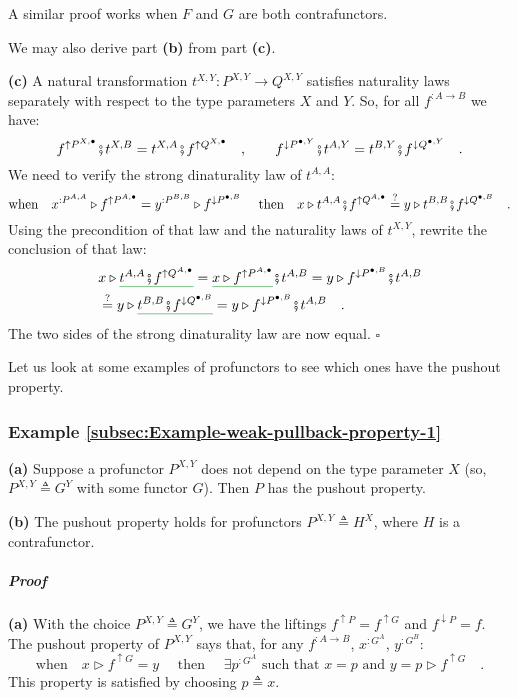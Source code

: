 A similar proof works when $F$ and $G$ are both contrafunctors.

We may also derive part \textbf{(b)} from part \textbf{(c)}.

\textbf{(c)} A natural transformation $t^{X,Y}:P^{X,Y}\rightarrow Q^{X,Y}$
satisfies naturality laws separately with respect to the type parameters
$X$ and $Y$. So, for all $f^{:A\rightarrow B}$ we have:
\[
f^{\uparrow P^{X,\bullet}}\bef t^{X,B}=t^{X,A}\bef f^{\uparrow Q^{X,\bullet}}\quad,\quad\quad f^{\downarrow P^{\bullet,Y}}\bef t^{A,Y}=t^{B,Y}\bef f^{\downarrow Q^{\bullet,Y}}\quad.
\]
We need to verify the strong dinaturality law of $t^{A,A}$:
\[
\text{when}\quad x^{:P^{A,A}}\triangleright f^{\uparrow P^{A,\bullet}}=y^{:P^{B,B}}\triangleright f^{\downarrow P^{\bullet,B}}\quad\text{ then}\quad x\triangleright t^{A,A}\bef f^{\uparrow Q^{A,\bullet}}\overset{?}{=}y\triangleright t^{B,B}\bef f^{\downarrow Q^{\bullet,B}}\quad.
\]
Using the precondition of that law and the naturality laws of $t^{X,Y}$,
rewrite the conclusion of that law:
\begin{align*}
 & x\triangleright\gunderline{t^{A,A}\bef f^{\uparrow Q^{A,\bullet}}}=\gunderline{x\triangleright f^{\uparrow P^{A,\bullet}}}\bef t^{A,B}=y\triangleright f^{\downarrow P^{\bullet,B}}\bef t^{A,B}\\
 & \overset{?}{=}y\triangleright\gunderline{t^{B,B}\bef f^{\downarrow Q^{\bullet,B}}}=y\triangleright f^{\downarrow P^{\bullet,B}}\bef t^{A,B}\quad.
\end{align*}
The two sides of the strong dinaturality law are now equal. $\square$

Let us look at some examples of profunctors to see which ones have
the pushout property.

\subsubsection{Example \label{subsec:Example-weak-pullback-property-1}\ref{subsec:Example-weak-pullback-property-1}}

\textbf{(a)} Suppose a profunctor $P^{X,Y}$ does not depend on the
type parameter $X$ (so, $P^{X,Y}\triangleq G^{Y}$ with some functor
$G$). Then $P$ has the pushout property. 

\textbf{(b)} The pushout property holds for profunctors $P^{X,Y}\triangleq H^{X}$,
where $H$ is a contrafunctor.

\subparagraph{Proof}

\textbf{(a)} With the choice $P^{X,Y}\triangleq G^{Y}$, we have the
liftings $f^{\uparrow P}=f^{\uparrow G}$ and $f^{\downarrow P}=f$.
The pushout property of $P^{X,Y}$ says that, for any $f^{:A\rightarrow B}$,
$x^{:G^{A}}$, $y^{:G^{B}}$:
\[
\text{when}\quad x\triangleright f^{\uparrow G}=y\quad\text{ then }\quad\exists p^{:G^{A}}\text{ such that }x=p\text{ and }y=p\triangleright f^{\uparrow G}\quad.
\]
This property is satisfied by choosing $p\triangleq x$.

